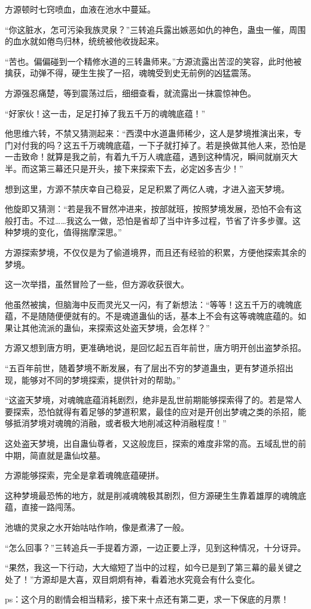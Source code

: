\begin{this_body}
方源顿时七窍喷血，血液在池水中蔓延。

“你这脏水，怎可污染我族灵泉？”三转追兵露出嫉恶如仇的神色，蛊虫一催，周围的血水就如倦鸟归林，统统被他收拢起来。

“苦也。偏偏碰到一个精修水道的三转蛊师来。”方源流露出苦涩的笑容，此时他被擒获，动弹不得，硬生生挨了一招，魂魄受到史无前例的凶猛震荡。

方源强忍痛楚，等到震荡过后，细细查看，就流露出一抹震惊神色。

“好家伙！这一击，足足打掉了我五千万的魂魄底蕴！”

他思维六转，不禁又猜测起来：“西漠中水道蛊师稀少，这人是梦境推演出来，专门对付我的吗？这五千万魂魄底蕴，一下子就打掉了。若是换做其他人来，恐怕是一击致命！就算是我之前，有着九千万人魂底蕴，遇到这种情况，瞬间就崩灭大半。而这第三幕还只是开头，接下来探索下去，必定凶多吉少！”

想到这里，方源不禁庆幸自己稳妥，足足积累了两亿人魂，才进入盗天梦境。

他旋即又猜测：“若是我不冒然冲进来，按部就班，按照梦境发展，恐怕不会有这般打击。不过……我这么一做，恐怕是省却了当中许多过程，节省了许多步骤。这种梦境的变化，值得揣摩深思。”

方源探索梦境，不仅仅是为了偷道境界，而且还有经验的积累，方便他探索其余的梦境。

这一次举措，虽然冒险了一些，但方源收获很大。

他虽然被擒，但脑海中反而灵光又一闪，有了新想法：“等等！这五千万的魂魄底蕴，不是随随便便就有的。不是魂道蛊仙的话，基本上不会有这等魂魄底蕴的。如果让其他流派的蛊仙，来探索这处盗天梦境，会怎样？”

方源又想到唐方明，更准确地说，是回忆起五百年前世，唐方明开创出盗梦杀招。

“五百年前世，随着梦境不断发展，有了层出不穷的梦道蛊虫，更有梦道杀招出现，能够对不同的梦境探索，提供针对的帮助。”

“这盗天梦境，对魂魄底蕴消耗剧烈，绝非是乱世前期能够探索得了的。若是常人要探索，恐怕就得有着足够的梦道积累，最佳的应对是开创出梦魂之类的杀招，能够抵消梦境对魂魄的消融，或者极大地削减这种消融程度！”

这处盗天梦境，出自蛊仙尊者，又这般庞巨，探索的难度非常的高。五域乱世的前中期，简直就是蛊仙坟墓。

方源能够探索，完全是拿着魂魄底蕴硬拼。

这种梦境最恐怖的地方，就是削减魂魄极其剧烈，但方源硬生生靠着雄厚的魂魄底蕴，直接一路闯荡。

池塘的灵泉之水开始咕咕作响，像是煮沸了一般。

“怎么回事？”三转追兵一手提着方源，一边正要上浮，见到这种情况，十分讶异。

“果然，我这一下行动，大大缩短了当中的过程，如今已是到了第三幕的最关键之处了！”方源却是大喜，双目炯炯有神，看着池水究竟会有什么变化。

ps：这个月的剧情会相当精彩，接下来十点还有第二更，求一下保底的月票！

\end{this_body}

